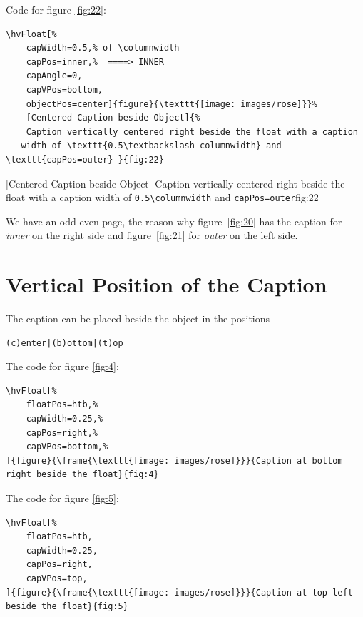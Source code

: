 \documentclass[twoside,paper=a4,usegeometry]{scrartcl}
\makeatletter
\def\hvblindtext{\textcolor{black!40}{\blindtext@text}}
\makeatother
\begin{document}
\hvblindtext

\label{page:2}
Code for figure \ref{fig:22}:
\begin{lstlisting}
\hvFloat[%
	capWidth=0.5,% of \columnwidth
	capPos=inner,%  ====> INNER
	capAngle=0,
	capVPos=bottom,
	objectPos=center]{figure}{\texttt{[image: images/rose]}}%
	[Centered Caption beside Object]{%
	Caption vertically centered right beside the float with a caption 
   width of \texttt{0.5\textbackslash columnwidth} and \texttt{capPos=outer} }{fig:22}
\end{lstlisting}

%
	[Centered Caption beside Object]{%
	Caption vertically centered right beside the float with a caption 
width of \texttt{0.5\textbackslash columnwidth} and \texttt{capPos=outer}}{fig:22}



We have an \checkoddpage
\ifoddpage odd \else
even \fi page, the reason why figure~\ref{fig:20} has the caption for \emph{inner} on the right side
and figure~\ref{fig:21} for \emph{outer} on the left side.


\section{Vertical Position of the Caption}
The caption can be placed beside the object in the positions 
\begin{verbatim}
(c)enter|(b)ottom|(t)op
\end{verbatim}

The code for figure \ref{fig:4}:
\begin{lstlisting}
\hvFloat[%
	floatPos=htb,%
	capWidth=0.25,%
	capPos=right,%
	capVPos=bottom,%
]{figure}{\frame{\texttt{[image: images/rose]}}}{Caption at bottom right beside the float}{fig:4}
\end{lstlisting}





The code for figure \ref{fig:5}:
\begin{lstlisting}
\hvFloat[%
	floatPos=htb,
	capWidth=0.25,
	capPos=right,
	capVPos=top,
]{figure}{\frame{\texttt{[image: images/rose]}}}{Caption at top left beside the float}{fig:5}
\end{lstlisting}
\end{document}
